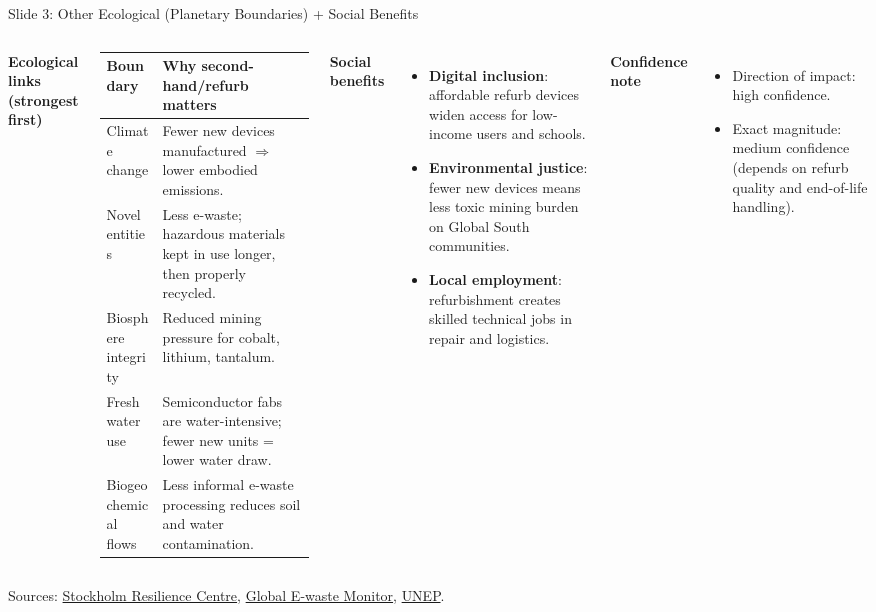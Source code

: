 \documentclass[aspectratio=169]{beamer}
\begin{document}
\begin{frame}{Slide 3: Other Ecological (Planetary Boundaries) + Social Benefits}
\scriptsize
\begin{columns}[T,totalwidth=\textwidth]
\textbf{Ecological links (strongest first)}
\begin{tabular}{p{2.4cm}p{4.8cm}}
\toprule
Boundary & Why second-hand/refurb matters \\
\midrule
Climate change & Fewer new devices manufactured $\Rightarrow$ lower embodied emissions. \\
Novel entities & Less e-waste; hazardous materials kept in use longer, then properly recycled. \\
Biosphere integrity & Reduced mining pressure for cobalt, lithium, tantalum. \\
Freshwater use & Semiconductor fabs are water-intensive; fewer new units = lower water draw. \\
Biogeochemical flows & Less informal e-waste processing reduces soil and water contamination. \\
\bottomrule
\end{tabular}

\textbf{Social benefits}
\begin{itemize}
  \item \textbf{Digital inclusion}: affordable refurb devices widen access for low-income users and schools.
  \item \textbf{Environmental justice}: fewer new devices means less toxic mining burden on Global South communities.
  \item \textbf{Local employment}: refurbishment creates skilled technical jobs in repair and logistics.
\end{itemize}

\textbf{Confidence note}
\begin{itemize}
  \item Direction of impact: high confidence.
  \item Exact magnitude: medium confidence (depends on refurb quality and end-of-life handling).
\end{itemize}
\end{columns}
\vspace{0.08cm}
\tiny Sources: \href{https://www.stockholmresilience.org/research/planetary-boundaries.html}{Stockholm Resilience Centre}, \href{https://ewastemonitor.info/the-global-e-waste-monitor-2024/}{Global E-waste Monitor}, \href{https://www.unep.org}{UNEP}.
\end{frame}
\end{document}
